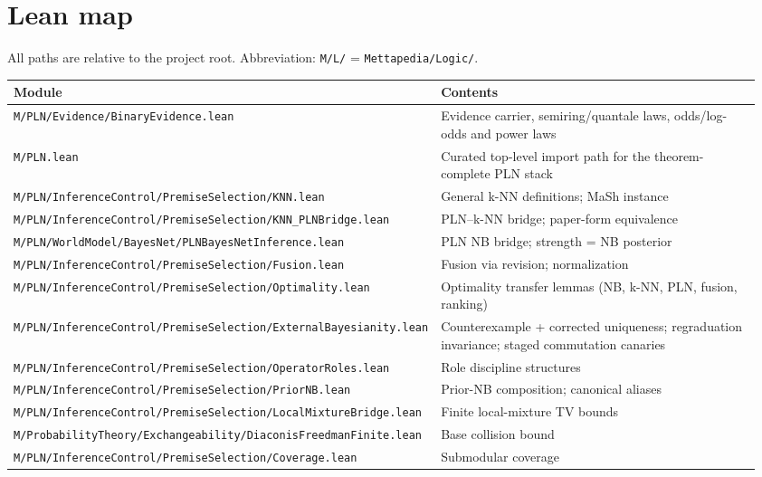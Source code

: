 \documentclass[11pt]{article}
\newcommand{\lpath}[1]{\texttt{\nolinkurl{#1}}}
\begin{document}
\section{Lean map}
\label{sec:leanmap}

All paths are relative to the project root.
Abbreviation: \texttt{M/L/} = \texttt{Mettapedia/Logic/}.

\begin{scriptsize}
\begin{longtable}{@{}L{0.48\linewidth}L{0.48\linewidth}@{}}
\toprule
\textbf{Module} & \textbf{Contents} \\
\midrule
\endhead
\lpath{M/PLN/Evidence/BinaryEvidence.lean}
  & Evidence carrier, semiring/quantale laws, odds/log-odds and power laws \\
\lpath{M/PLN.lean}
  & Curated top-level import path for the theorem-complete PLN stack \\
\lpath{M/PLN/InferenceControl/PremiseSelection/KNN.lean}
  & General k-NN definitions; MaSh instance \\
\lpath{M/PLN/InferenceControl/PremiseSelection/KNN_PLNBridge.lean}
  & PLN--k-NN bridge; paper-form equivalence \\
\lpath{M/PLN/WorldModel/BayesNet/PLNBayesNetInference.lean}
  & PLN NB bridge; strength = NB posterior \\
\lpath{M/PLN/InferenceControl/PremiseSelection/Fusion.lean}
  & Fusion via revision; normalization \\
\lpath{M/PLN/InferenceControl/PremiseSelection/Optimality.lean}
  & Optimality transfer lemmas (NB, k-NN, PLN, fusion, ranking) \\
\lpath{M/PLN/InferenceControl/PremiseSelection/ExternalBayesianity.lean}
  & Counterexample + corrected uniqueness; regraduation invariance;
    staged commutation canaries \\
\lpath{M/PLN/InferenceControl/PremiseSelection/OperatorRoles.lean}
  & Role discipline structures \\
\lpath{M/PLN/InferenceControl/PremiseSelection/PriorNB.lean}
  & Prior-NB composition; canonical aliases \\
\lpath{M/PLN/InferenceControl/PremiseSelection/LocalMixtureBridge.lean}
  & Finite local-mixture TV bounds \\
\lpath{M/ProbabilityTheory/Exchangeability/DiaconisFreedmanFinite.lean}
  & Base collision bound \\
\lpath{M/PLN/InferenceControl/PremiseSelection/Coverage.lean}
  & Submodular coverage \\

\end{longtable}
\end{scriptsize}
\end{document}
